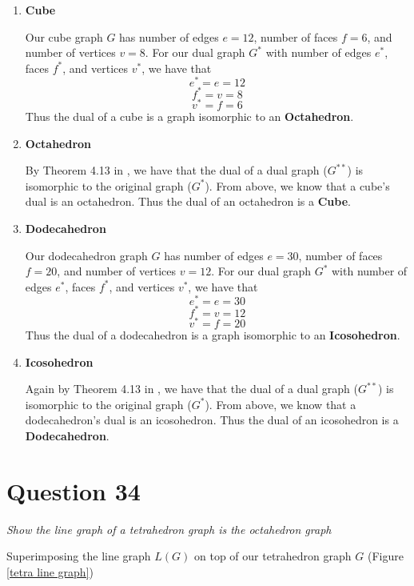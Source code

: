 \documentclass[11pt, oneside]{article}   	%
\begin{document}
\begin{enumerate}
	\item \textbf{Cube}
	
	Our cube graph $G$ has number of edges $e=12$, number of faces $f=6$, and number of vertices $v=8$. For our dual graph $G^*$ with number of edges $e^*$, faces $f^*$, and vertices $v^*$, we have
 that 
 	$$e^* = e = 12$$
	$$f^* = v = 8$$
	$$v^*=f = 6$$
	Thus the dual of a cube is a graph isomorphic to an \textbf{Octahedron}. 
	
	\item \textbf{Octahedron}
	
	By Theorem 4.13 in \cite{graph}, we have that the dual of a dual graph ($G^{**}$) is isomorphic to the original graph ($G^*$). From above, we know that a cube's dual is an octahedron. Thus the dual of an octahedron is a \textbf{Cube}.
	
	\item \textbf{Dodecahedron}
	
	Our dodecahedron graph $G$ has number of edges $e=30$, number of faces $f=20$, and number of vertices $v=12$. For our dual graph $G^*$ with number of edges $e^*$, faces $f^*$, and vertices $v^*$, we have
 that 
 	$$e^* = e = 30$$
	$$f^* = v = 12$$
	$$v^*=f = 20$$
	Thus the dual of a dodecahedron is a graph isomorphic to an \textbf{Icosohedron}. 
	
	\item \textbf{Icosohedron}
	
	Again by Theorem 4.13 in \cite{graph}, we have that the dual of a dual graph ($G^{**}$) is isomorphic to the original graph ($G^*$). From above, we know that a dodecahedron's dual is an icosohedron. Thus the dual of an icosohedron is a \textbf{Dodecahedron}.
	
\end{enumerate}


\section*{Question 34}

\emph{Show the line graph of a tetrahedron graph is the octahedron graph}

Superimposing the line graph $L(G)$ on top of our tetrahedron graph $G$ (Figure \ref{tetra line graph})
\end{document}

